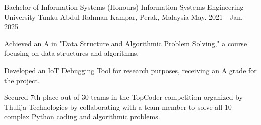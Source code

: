 

\begin{cventries}

  \cventry
    {Bachelor of Information Systems (Honours) Information Systems Engineering} %
    {University Tunku Abdul Rahman} %
    {Kampar, Perak, Malaysia} %
    {May. 2021 - Jan. 2025} %
    {
      \begin{cvitems} %
        \item {Achieved an A in "Data Structure and Algorithmic Problem Solving," a course focusing on data structures and algorithms.}
        \item {Developed an IoT Debugging Tool for research purposes, receiving an A grade for the project.}
        \item {Secured 7th place out of 30 teams in the TopCoder competition organized by Thulija Technologies by collaborating with a team member to solve all 10 complex Python coding and algorithmic problems.}
      \end{cvitems}
    }
\end{cventries}
